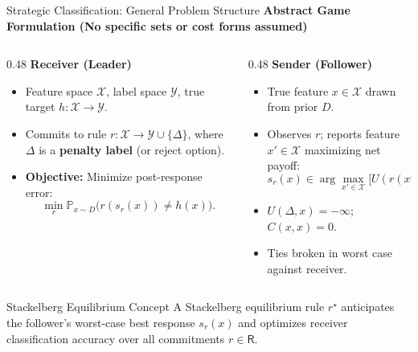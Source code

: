 \documentclass[aspectratio=169, 11pt, t, xcolor=table]{beamer}
\newcommand{\prob}{\mathbb{P}}
\newcommand{\cg}[1]{\mathcal{#1}}
\newcommand{\msf}[1]{\mathsf{#1}}
\newcommand{\rs}{r^{\star}}
\begin{document}
\begin{frame}{Strategic Classification: General Problem Structure}
\small
\textbf{Abstract Game Formulation (No specific sets or cost forms assumed)}

\par\vspace{0.3em}
\begin{columns}[T,onlytextwidth]
\begin{column}{0.48\textwidth}
\textcolor{IITBNavy}{\textbf{Receiver (Leader)}}
\begin{itemize}\itemsep=1.5pt
  \footnotesize
  \item Feature space $\cg{X}$, label space $\cg{Y}$, true target $h: \cg{X} \to \cg{Y}$.
  \item Commits to rule $r: \cg{X} \to \cg{Y} \cup \{\Delta\}$, where $\Delta$ is a \textbf{penalty label} (or reject option).
  \item \textbf{Objective:} Minimize post-response error:
    \[
      \min_{r} \prob_{x \sim D}\big( r(s_r(x)) \neq h(x) \big).
    \]
\end{itemize}
\end{column}

\begin{column}{0.48\textwidth}
\textcolor{IITBNavy}{\textbf{Sender (Follower)}}
\begin{itemize}\itemsep=1.5pt
  \footnotesize
  \item True feature $x \in \cg{X}$ drawn from prior $D$.
  \item Observes $r$; reports feature $x' \in \cg{X}$ maximizing net payoff:
    \[
      s_r(x) \in \arg\max_{x' \in \cg{X}} \big[ U(r(x'), x) - C(x, x') \big].
    \]
  \item $U(\Delta, x) = -\infty$; $C(x, x) = 0$.
  \item Ties broken in worst case against receiver.
\end{itemize}
\end{column}
\end{columns}

\par\vspace{0.4em}
\begin{block}{Stackelberg Equilibrium Concept}
\footnotesize
A Stackelberg equilibrium rule $\rs$ anticipates the follower's worst-case best response $s_r(x)$ and optimizes receiver classification accuracy over all commitments $r \in \msf{R}$.
\end{block}
\end{frame}
\end{document}

